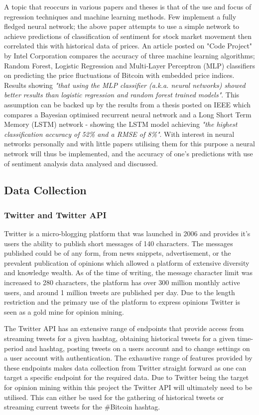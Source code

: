 \documentclass[oneside, 12pt]{article}
\begin{document}
		A topic that reoccurs in various papers and theses is that of the use and focus of regression techniques and machine learning methods. Few implement a fully fledged neural network; the above paper attempts to use a simple network to achieve predictions of classification of sentiment for stock market movement then correlated this with historical data of prices. An article posted on "Code Project" by Intel Corporation \cite{5} compares the accuracy of three machine learning algorithms; Random Forest, Logistic Regression and Multi-Layer Perceptron (MLP) classifiers on predicting the price fluctuations of Bitcoin with embedded price indices. Results showing \textit{"that using the MLP classifier (a.k.a. neural networks) showed better results than logistic regression and random forest trained models"}. This assumption can be backed up by the results from a thesis posted on IEEE \cite{6} which compares a Bayesian optimised recurrent neural network and a Long Short Term Memory (LSTM) network - showing the LSTM model achieving \textit{"the highest classification accuracy of 52\% and a RMSE of 8\%"}. With interest in neural networks personally and with little papers utilising them for this purpose a neural network will thus be implemented, and the accuracy of one's predictions with use of sentiment analysis data analysed and discussed.
			
		\subsection{Data Collection}\label{tweet_collection}
			
			\subsubsection{Twitter and Twitter API}
			Twitter is a micro-blogging platform that was launched in 2006 and provides it's users the ability to publish short messages of 140 characters. The messages published could be of any form, from news snippets, advertisement, or the prevalent publication of opinions which allowed a platform of extensive diversity and knowledge wealth. As of the time of writing, the message character limit was increased to 280 characters, the platform has over 300 million monthly active users, and around 1 million tweets are published per day. Due to the length restriction and the primary use of the platform to express opinions Twitter is seen as a gold mine for opinion mining.
			
			The Twitter API has an extensive range of endpoints that provide access from streaming tweets for a given hashtag, obtaining historical tweets for a given time-period and hashtag, posting tweets on a users account and to change settings on a user account with authentication. The exhaustive range of features provided by these endpoints makes data collection from Twitter straight forward as one can target a specific endpoint for the required data. Due to Twitter being the target for opinion mining within this project the Twitter API will ultimately need to be utilised. This can either be used for the gathering of historical tweets or streaming current tweets for the \#Bitcoin hashtag.
			
\end{document}
